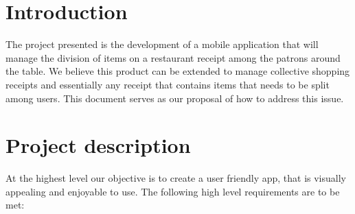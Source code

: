 \documentclass[12pt,a4paper]{article}
\begin{document}
   \section{Introduction}
   The project presented is the development of a mobile application that will manage the division of items on a restaurant receipt among the patrons around the table. We believe this product can be extended to manage
   collective shopping receipts and essentially any receipt that contains items that needs to be split among users. This document serves as our proposal of how to address this issue.

   \section{Project description}
   At the highest level our objective is to create a user friendly app, that is visually appealing and enjoyable to use. The following high level requirements are to be met:
\end{document}
